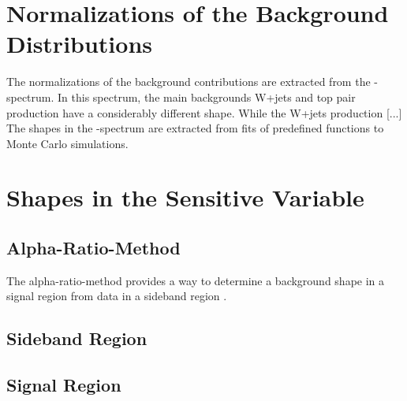\section{Normalizations of the Background Distributions}
The normalizations of the background contributions are extracted from the \Mpr -spectrum. In this spectrum, the main backgrounds W+jets and top pair production have a considerably different shape. While the W+jets production [...]\\
The shapes in the \Mpr -spectrum are extracted from fits of predefined functions to Monte Carlo simulations. 

\section{Shapes in the Sensitive Variable}

\subsection{Alpha-Ratio-Method}
\label{sec:Al[haRatioMethod}
The alpha-ratio-method provides a way to determine a background shape in a signal region from data in a sideband region \cite{missing}.

\subsection{Sideband Region}

\subsection{Signal Region}
